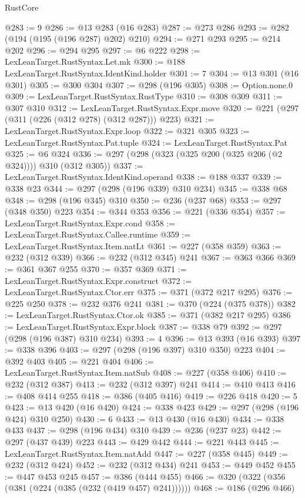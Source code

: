 \begin{lexlean}{RustCore}
\begin{coremodule}
@283 := 9
@286 := @13 @283 (@16 @283)
@287 := @273 @286
@293 := @282 (@194 (@195 (@196 @287) @202) @210)
@294 := @271 @293
@295 := @214 @202
@296 := @294 @295
@297 := @6 @222
@298 := LexLeanTarget.RustSyntax.Let.mk
@300 := @188 LexLeanTarget.RustSyntax.IdentKind.holder
@301 := 7
@304 := @13 @301 (@16 @301)
@305 := @300 @304
@307 := @298 (@196 @305)
@308 := Option.none.{0}
@309 := LexLeanTarget.RustSyntax.RustType
@310 := @308 @309
@311 := @307 @310
@312 := LexLeanTarget.RustSyntax.Expr.move
@320 := @221 (@297 (@311 (@226 (@312 @278) (@312 @287))) @223)
@321 := LexLeanTarget.RustSyntax.Expr.loop
@322 := @321 @305
@323 := LexLeanTarget.RustSyntax.Pat.tuple
@324 := LexLeanTarget.RustSyntax.Pat
@325 := @6 @324
@336 := @297 (@298 (@323 (@325 @200 (@325 @206 (@2 @324)))) @310 (@312 @305))
@337 := LexLeanTarget.RustSyntax.IdentKind.operand
@338 := @188 @337
@339 := @338 @23
@344 := @297 (@298 (@196 @339) @310 @234)
@345 := @338 @68
@348 := @298 (@196 @345) @310
@350 := @236 (@237 @68)
@353 := @297 (@348 @350) @223
@354 := @344 @353
@356 := @221 (@336 @354)
@357 := LexLeanTarget.RustSyntax.Expr.cond
@358 := LexLeanTarget.RustSyntax.Callee.runtime
@359 := LexLeanTarget.RustSyntax.Item.natLt
@361 := @227 (@358 @359)
@363 := @232 (@312 @339)
@366 := @232 (@312 @345) @241
@367 := @363 @366
@369 := @361 @367 @255
@370 := @357 @369
@371 := LexLeanTarget.RustSyntax.Expr.construct
@372 := LexLeanTarget.RustSyntax.Ctor.err
@375 := @371 (@372 @217 @295)
@376 := @225 @250
@378 := @232 @376 @241
@381 := @370 (@224 (@375 @378))
@382 := LexLeanTarget.RustSyntax.Ctor.ok
@385 := @371 (@382 @217 @295)
@386 := LexLeanTarget.RustSyntax.Expr.block
@387 := @338 @79
@392 := @297 (@298 (@196 @387) @310 @234)
@393 := 4
@396 := @13 @393 (@16 @393)
@397 := @338 @396
@403 := @297 (@298 (@196 @397) @310 @350) @223
@404 := @392 @403
@405 := @221 @404
@406 := LexLeanTarget.RustSyntax.Item.natSub
@408 := @227 (@358 @406)
@410 := @232 (@312 @387)
@413 := @232 (@312 @397) @241
@414 := @410 @413
@416 := @408 @414 @255
@418 := @386 (@405 @416)
@419 := @226 @418
@420 := 5
@423 := @13 @420 (@16 @420)
@424 := @338 @423
@429 := @297 (@298 (@196 @424) @310 @250)
@430 := 6
@433 := @13 @430 (@16 @430)
@434 := @338 @433
@437 := @298 (@196 @434) @310
@439 := @236 (@237 @23)
@442 := @297 (@437 @439) @223
@443 := @429 @442
@444 := @221 @443
@445 := LexLeanTarget.RustSyntax.Item.natAdd
@447 := @227 (@358 @445)
@449 := @232 (@312 @424)
@452 := @232 (@312 @434) @241
@453 := @449 @452
@455 := @447 @453 @245
@457 := @386 (@444 @455)
@466 := @320 (@322 (@356 (@381 (@224 (@385 (@232 (@419 @457) @241))))))
@468 := @186 (@296 @466)

\end{coremodule}
\end{lexlean}
